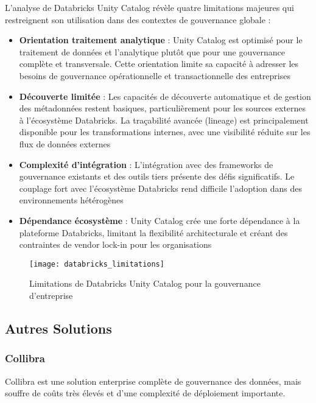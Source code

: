 L'analyse de Databricks Unity Catalog révèle quatre limitations majeures qui restreignent son utilisation dans des contextes de gouvernance globale :

\begin{itemize}
    \item \textbf{Orientation traitement analytique} : Unity Catalog est optimisé pour le traitement de données et l'analytique plutôt que pour une gouvernance complète et transversale. Cette orientation limite sa capacité à adresser les besoins de gouvernance opérationnelle et transactionnelle des entreprises
    
    \item \textbf{Découverte limitée} : Les capacités de découverte automatique et de gestion des métadonnées restent basiques, particulièrement pour les sources externes à l'écosystème Databricks. La traçabilité avancée (lineage) est principalement disponible pour les transformations internes, avec une visibilité réduite sur les flux de données externes
    
    \item \textbf{Complexité d'intégration} : L'intégration avec des frameworks de gouvernance existants et des outils tiers présente des défis significatifs. Le couplage fort avec l'écosystème Databricks rend difficile l'adoption dans des environnements hétérogènes
    
    \item \textbf{Dépendance écosystème} : Unity Catalog crée une forte dépendance à la plateforme Databricks, limitant la flexibilité architecturale et créant des contraintes de vendor lock-in pour les organisations
\end{itemize}

\begin{figure}[htpb]
\centering
\texttt{[image: databricks\_limitations]}
\caption{Limitations de Databricks Unity Catalog pour la gouvernance d'entreprise}
\label{fig:databricks_limitations}
\end{figure}

\subsection{Autres Solutions}

\subsubsection{Collibra}

Collibra est une solution enterprise complète de gouvernance des données, mais souffre de coûts très élevés et d'une complexité de déploiement importante.

